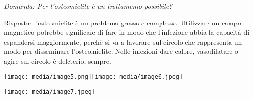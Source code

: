 \documentclass[]{article}
\begin{document}
\emph{Domanda: Per l'osteomielite è un trattamento possibile?}

Risposta: l'osteomielite è un problema grosso e complesso. Utilizzare un
campo magnetico potrebbe significare di fare in modo che l'infezione
abbia la capacità di espandersi maggiormente, perchè si va a lavorare
sul circolo che rappresenta un modo per disseminare l'osteomielite.
Nelle infezioni dare calore, vasodilatare o agire sul circolo è
deleterio, sempre.

\texttt{[image: media/image5.png]}\texttt{[image: media/image6.jpeg]}

\texttt{[image: media/image7.jpeg]}
\end{document}
